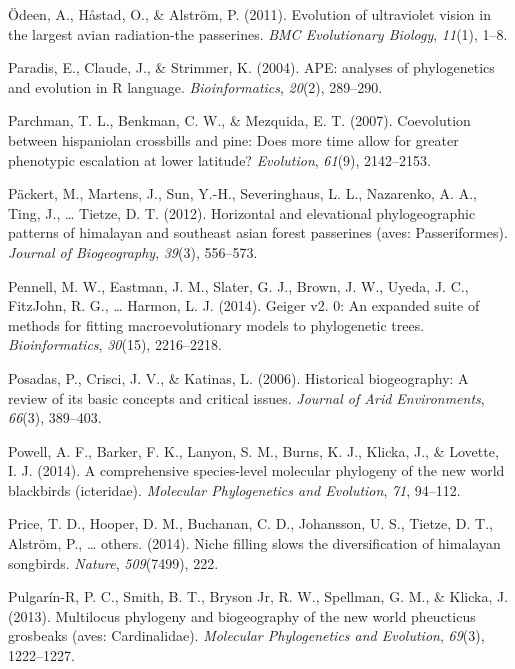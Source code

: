 \documentclass[english,man]{apa6}
\begin{document}
\leavevmode\hypertarget{ref-odeen2011evolution}{}%
Ödeen, A., Håstad, O., \& Alström, P. (2011). Evolution of ultraviolet vision in the largest avian radiation-the passerines. \emph{BMC Evolutionary Biology}, \emph{11}(1), 1--8.

\leavevmode\hypertarget{ref-paradis2004}{}%
Paradis, E., Claude, J., \& Strimmer, K. (2004). APE: analyses of phylogenetics and evolution in R language. \emph{Bioinformatics}, \emph{20}(2), 289--290.

\leavevmode\hypertarget{ref-parchman2007coevolution}{}%
Parchman, T. L., Benkman, C. W., \& Mezquida, E. T. (2007). Coevolution between hispaniolan crossbills and pine: Does more time allow for greater phenotypic escalation at lower latitude? \emph{Evolution}, \emph{61}(9), 2142--2153.

\leavevmode\hypertarget{ref-packert2012horizontal}{}%
Päckert, M., Martens, J., Sun, Y.-H., Severinghaus, L. L., Nazarenko, A. A., Ting, J., \ldots{} Tietze, D. T. (2012). Horizontal and elevational phylogeographic patterns of himalayan and southeast asian forest passerines (aves: Passeriformes). \emph{Journal of Biogeography}, \emph{39}(3), 556--573.

\leavevmode\hypertarget{ref-pennell2014geiger}{}%
Pennell, M. W., Eastman, J. M., Slater, G. J., Brown, J. W., Uyeda, J. C., FitzJohn, R. G., \ldots{} Harmon, L. J. (2014). Geiger v2. 0: An expanded suite of methods for fitting macroevolutionary models to phylogenetic trees. \emph{Bioinformatics}, \emph{30}(15), 2216--2218.

\leavevmode\hypertarget{ref-posadas2006historical}{}%
Posadas, P., Crisci, J. V., \& Katinas, L. (2006). Historical biogeography: A review of its basic concepts and critical issues. \emph{Journal of Arid Environments}, \emph{66}(3), 389--403.

\leavevmode\hypertarget{ref-powell2014comprehensive}{}%
Powell, A. F., Barker, F. K., Lanyon, S. M., Burns, K. J., Klicka, J., \& Lovette, I. J. (2014). A comprehensive species-level molecular phylogeny of the new world blackbirds (icteridae). \emph{Molecular Phylogenetics and Evolution}, \emph{71}, 94--112.

\leavevmode\hypertarget{ref-price2014niche}{}%
Price, T. D., Hooper, D. M., Buchanan, C. D., Johansson, U. S., Tietze, D. T., Alström, P., \ldots{} others. (2014). Niche filling slows the diversification of himalayan songbirds. \emph{Nature}, \emph{509}(7499), 222.

\leavevmode\hypertarget{ref-pulgarin2013multilocus}{}%
Pulgarín-R, P. C., Smith, B. T., Bryson Jr, R. W., Spellman, G. M., \& Klicka, J. (2013). Multilocus phylogeny and biogeography of the new world pheucticus grosbeaks (aves: Cardinalidae). \emph{Molecular Phylogenetics and Evolution}, \emph{69}(3), 1222--1227.
\end{document}
